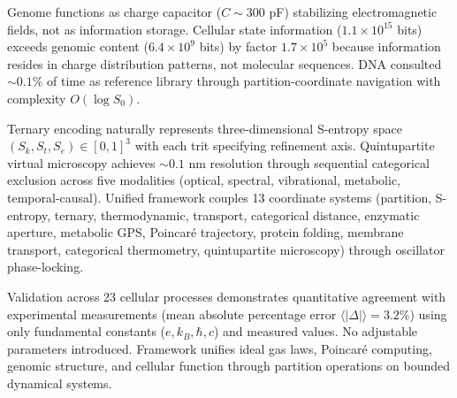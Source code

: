 \documentclass[11pt,a4paper]{article}
\theoremstyle{remark}
\newcommand{\Sk}{S_k}
\newcommand{\St}{S_t}
\newcommand{\Se}{S_e}
\begin{document}
Genome functions as charge capacitor ($C \sim 300$ pF) stabilizing electromagnetic fields, not as information storage. Cellular state information ($1.1 \times 10^{15}$ bits) exceeds genomic content ($6.4 \times 10^9$ bits) by factor $1.7 \times 10^5$ because information resides in charge distribution patterns, not molecular sequences. DNA consulted $\sim 0.1\%$ of time as reference library through partition-coordinate navigation with complexity $O(\log S_0)$.

Ternary encoding naturally represents three-dimensional S-entropy space $(\Sk, \St, \Se) \in [0,1]^3$ with each trit specifying refinement axis. Quintupartite virtual microscopy achieves $\sim 0.1$ nm resolution through sequential categorical exclusion across five modalities (optical, spectral, vibrational, metabolic, temporal-causal). Unified framework couples 13 coordinate systems (partition, S-entropy, ternary, thermodynamic, transport, categorical distance, enzymatic aperture, metabolic GPS, Poincaré trajectory, protein folding, membrane transport, categorical thermometry, quintupartite microscopy) through oscillator phase-locking.

Validation across 23 cellular processes demonstrates quantitative agreement with experimental measurements (mean absolute percentage error $\langle|\Delta|\rangle = 3.2\%$) using only fundamental constants ($e, k_B, \hbar, c$) and measured values. No adjustable parameters introduced. Framework unifies ideal gas laws, Poincaré computing, genomic structure, and cellular function through partition operations on bounded dynamical systems.



\end{document}
